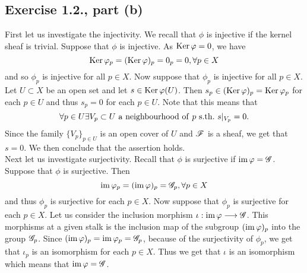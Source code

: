 \documentclass[11pt, a4paper, twoside]{article}
\begin{document}
\subsection{Exercise 1.2., part (b)}
	First let us investigate the injectivity. We recall that $\phi$ is injective if the kernel sheaf is trivial. Suppose that $\phi$ is injective. As $\operatorname{Ker}\varphi=0$, we have 
	\begin{displaymath}
		\operatorname{Ker}\varphi_p=(\operatorname{Ker}\varphi)_p=0_p=0,\forall p\in X
	\end{displaymath}
	and so $\phi_p$ is injective for all $p\in X$. Now suppose that $\phi_p$ is injective for all $p\in X$. Let $U\subset X$ be an open set and let $s\in\operatorname{Ker}\varphi(U)$. Then $s_p\in(\operatorname{Ker}\varphi)_p=\operatorname{Ker}\varphi_p$ for each $p\in U$ and thus $s_p=0$ for each $p\in U$. Note that this means that
	\begin{displaymath}
		\forall p\in U\exists V_p\subset U\ \mathrm{a\ neighbourhood\ of}\ p\ \mathrm{s.th.}\ s\restr{V_p}=0.
	\end{displaymath}
	Since the family $\{V_p\}_{p\in U}$ is an open cover of $U$ and $\mathscr F$ is a sheaf, we get that $s=0$. We then conclude that the assertion holds.\\
	Next let us investigate surjectivity. Recall that $\phi$ is surjective if $\operatorname{im}\varphi=\mathscr G$. Suppose that $\phi$ is surjective. Then 
	\begin{displaymath}
		\operatorname{im}\varphi_p=(\operatorname{im}\varphi)_p=\mathscr G_p,\forall p\in X
	\end{displaymath}
	and thus $\phi_p$ is surjective for each $p\in X$. Now suppose that $\phi_p$ is surjective for each $p\in X$. Let us consider the inclusion morphism $\iota:\operatorname{im}\varphi\longrightarrow\mathscr G$. This morphisms at a given stalk is the inclusion map of the subgroup $(\operatorname{im}\varphi)_p$ into the group $\mathscr G_p$. Since $(\operatorname{im}\varphi)_p=\operatorname{im}\varphi_p=\mathscr G_p$, because of the surjectivity of $\phi_p$, we get that $\iota_p$ is an isomorphism for each $p\in X$. Thus we get that $\iota$ is an isomorphism which means that $\operatorname{im}\varphi=\mathscr G$.
	
\end{document}
